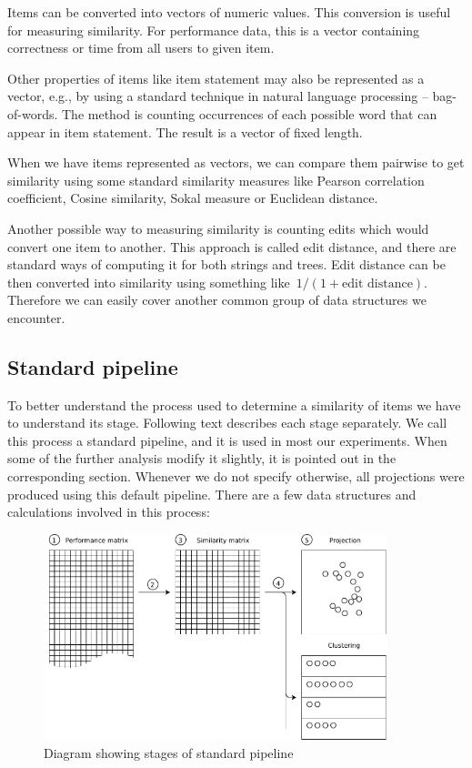 \documentclass[
  printed, %
  table,   %
  nolof,     %
  nolot,     %
  color,
  final,
  nocover
]{fithesis3}
\begin{document}

Items can be converted into vectors of numeric values. This conversion is useful for measuring similarity. For performance data, this is a vector containing correctness or time from all users to given item.

Other properties of items like item statement may also be represented as a vector, e.g., by using a standard technique in natural language processing -- bag-of-words. The method is counting occurrences of each possible word that can appear in item statement. The result is a vector of fixed length.

When we have items represented as vectors, we can compare them pairwise to get similarity using some standard similarity measures like Pearson correlation coefficient, Cosine similarity, Sokal measure or Euclidean distance.


Another possible way to measuring similarity is counting edits which would convert one item to another. This approach is called edit distance, and there are standard ways of computing it for both strings and trees. Edit distance can be then converted into similarity using something like~$1 / (1 + \text{edit distance})$. Therefore we can easily cover another common group of data structures we encounter.


\subsection{Standard pipeline}\label{standard-pipeline}


To better understand the process used to determine a similarity of items we have to understand its stage. Following text describes each stage separately. We call this process a standard pipeline, and it is used in most our experiments. When some of the further analysis modify it slightly, it is pointed out in the corresponding section. Whenever we do not specify otherwise, all projections were produced using this default pipeline. There are a few data structures and calculations involved in this process:

\begin{figure}
  \includegraphics[width=10cm]{img/pipeline_diagram}
  \caption{Diagram showing stages of standard pipeline}
  \label{fig:pipeline_diagram}
\end{figure}
\end{document}
